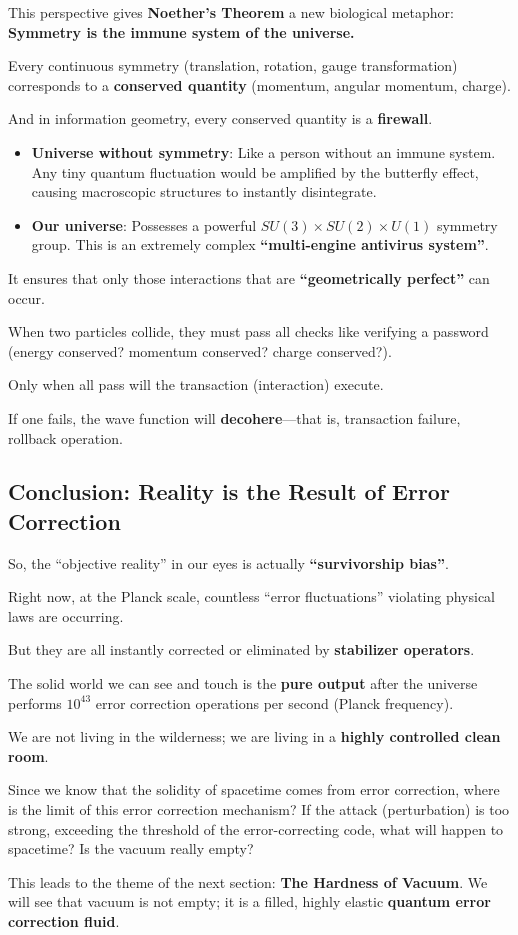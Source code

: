 This perspective gives \textbf{Noether's Theorem} a new biological metaphor: \textbf{Symmetry is the immune system of the universe.}

Every continuous symmetry (translation, rotation, gauge transformation) corresponds to a \textbf{conserved quantity} (momentum, angular momentum, charge).

And in information geometry, every conserved quantity is a \textbf{firewall}.

\begin{itemize}
\item \textbf{Universe without symmetry}: Like a person without an immune system. Any tiny quantum fluctuation would be amplified by the butterfly effect, causing macroscopic structures to instantly disintegrate.

\item \textbf{Our universe}: Possesses a powerful $SU(3) \times SU(2) \times U(1)$ symmetry group. This is an extremely complex \textbf{``multi-engine antivirus system''}.
\end{itemize}

It ensures that only those interactions that are \textbf{``geometrically perfect''} can occur.

When two particles collide, they must pass all checks like verifying a password (energy conserved? momentum conserved? charge conserved?).

Only when all pass will the transaction (interaction) execute.

If one fails, the wave function will \textbf{decohere}---that is, transaction failure, rollback operation.

\subsection{Conclusion: Reality is the Result of Error Correction}

So, the ``objective reality'' in our eyes is actually \textbf{``survivorship bias''}.

Right now, at the Planck scale, countless ``error fluctuations'' violating physical laws are occurring.

But they are all instantly corrected or eliminated by \textbf{stabilizer operators}.

The solid world we can see and touch is the \textbf{pure output} after the universe performs $10^{43}$ error correction operations per second (Planck frequency).

We are not living in the wilderness; we are living in a \textbf{highly controlled clean room}.

Since we know that the solidity of spacetime comes from error correction, where is the limit of this error correction mechanism? If the attack (perturbation) is too strong, exceeding the threshold of the error-correcting code, what will happen to spacetime? Is the vacuum really empty?

This leads to the theme of the next section: \textbf{The Hardness of Vacuum}. We will see that vacuum is not empty; it is a filled, highly elastic \textbf{quantum error correction fluid}.

